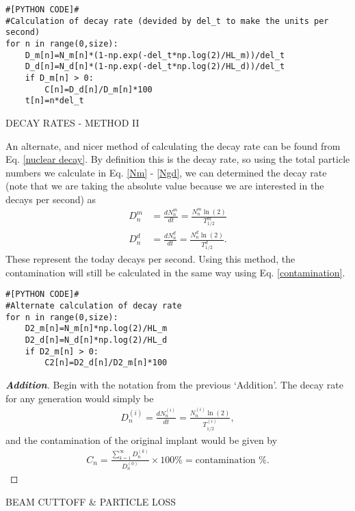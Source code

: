 \documentclass[11pt]{article}
\newenvironment{Addition}
{\let\oldqedsymbol=\qedsymbol
	\renewcommand{\qedsymbol}{$ $}
	\begin{proof}[\bfseries\upshape \color{blue}Addition]\color{blue}}
	{\end{proof}
	\renewcommand{\qedsymbol}{\oldqedsymbol}}
\begin{document}
\begin{lstlisting}
#[PYTHON CODE]#
#Calculation of decay rate (devided by del_t to make the units per second)
for n in range(0,size):
	D_m[n]=N_m[n]*(1-np.exp(-del_t*np.log(2)/HL_m))/del_t
	D_d[n]=N_d[n]*(1-np.exp(-del_t*np.log(2)/HL_d))/del_t
	if D_m[n] > 0:
		C[n]=D_d[n]/D_m[n]*100
	t[n]=n*del_t
\end{lstlisting}

\begin{center}
	DECAY RATES - METHOD II
\end{center}

An alternate, and nicer method of calculating the decay rate can be found from Eq. \ref{nuclear decay}. By definition this is the decay rate, so using the total particle numbers we calculate in Eq. \ref{Nm} - \ref{Ngd}, we can determined the decay rate (note that we are taking the absolute value because we are interested in the decays per second) as
\begin{align}
D^m_n &= \frac{dN^m_n}{dt} = \frac{N^m_n \ln(2)}{T^m_{1/2}} \\
D^d_n &= \frac{dN^d_n}{dt} = \frac{N^d_n \ln(2)}{T^d_{1/2}}.
\end{align}
These represent the today decays per second. Using this method, the contamination will still be calculated in the same way using Eq. \ref{contamination}.

\begin{lstlisting}
#[PYTHON CODE]#
#Alternate calculation of decay rate
for n in range(0,size):
	D2_m[n]=N_m[n]*np.log(2)/HL_m
	D2_d[n]=N_d[n]*np.log(2)/HL_d
	if D2_m[n] > 0:
		C2[n]=D2_d[n]/D2_m[n]*100
\end{lstlisting}

\begin{Addition}
	Begin with the notation from the previous `Addition'. The decay rate for any generation would simply be
	\begin{align}
	D^{(i)}_n = \frac{dN^{(i)}_n}{dt} = \frac{N^{(i)}_n \ln(2)}{T^{(i)}_{1/2}}, \label{DecayRate_i}
	\end{align}
	and the contamination of the original implant would be given by
	\begin{align}
	C_n=\frac{\sum_{k=1}^{\infty}D^{(k)}_n}{D^{(0)}_n} \times 100  \%=\textrm{contamination \%}. \label{contamination_i}
	\end{align}
\end{Addition}

\begin{center}
	BEAM CUTTOFF \& PARTICLE LOSS
\end{center}
\end{document}
